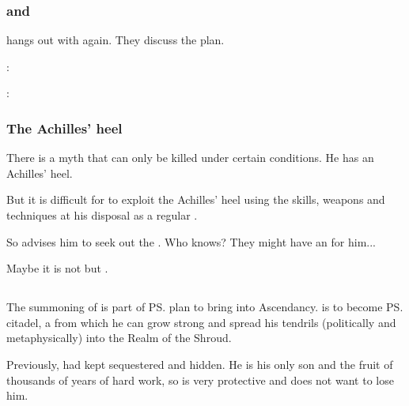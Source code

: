 \begin{garbage}
\subsubsection{\Teshrial{} and \Menessiaraid}
\Teshrial{} hangs out with \Menessiaraid{} again. 
They discuss the plan. 

\begin{prose}
  \Teshrial: 
  
  \Menessiaraid: 
\end{prose}





\subsubsection{The Achilles' heel}
There is a myth that \Ishnaruchaefir{} can only be killed under certain conditions. 
He has an Achilles' heel. 

But it is difficult for \Teshrial{} to exploit the Achilles' heel using the skills, weapons and techniques at his disposal as a regular \resphan. 

So \Menessiaraid{} advises him to seek out the . 
Who knows? 
They might have an  for him...

Maybe it is not \Menessiaraid{} but \Azraid{} . 









\subsection{\Vizsherioch}
%
The summoning of \Nithdornazsh{} is part of \ps{\Secherdamon} plan to bring \hs{\Vizsherioch} into Ascendancy. 
\Nithdornazsh{} is to become \ps{\Vizsherioch} citadel, a \nexus{} from which he can grow strong and spread his tendrils (politically and metaphysically) into the Realm of the Shroud. 

Previously, \Secherdamon{} had kept \Vizsherioch{} sequestered and hidden. 
He is his only son and the fruit of thousands of years of hard work, so \Secherdamon{} is very protective and does not want to lose him. 


\end{garbage}
